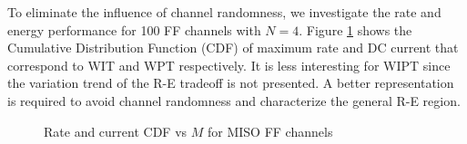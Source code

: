 To eliminate the influence of channel randomness, we investigate the rate and energy performance for 100 FF channels with $N = 4$. Figure \ref{fig:miso-cdf} shows the Cumulative Distribution Function (CDF) of maximum rate and DC current that correspond to WIT and WPT respectively. It is less interesting for WIPT since the variation trend of the R-E tradeoff is not presented. A better representation is required to avoid channel randomness and characterize the general R-E region.

\begin{figure}[ht]
  \centering
  \caption{Rate and current CDF vs $M$ for MISO FF channels}
  \label{fig:miso-cdf}
\end{figure} 